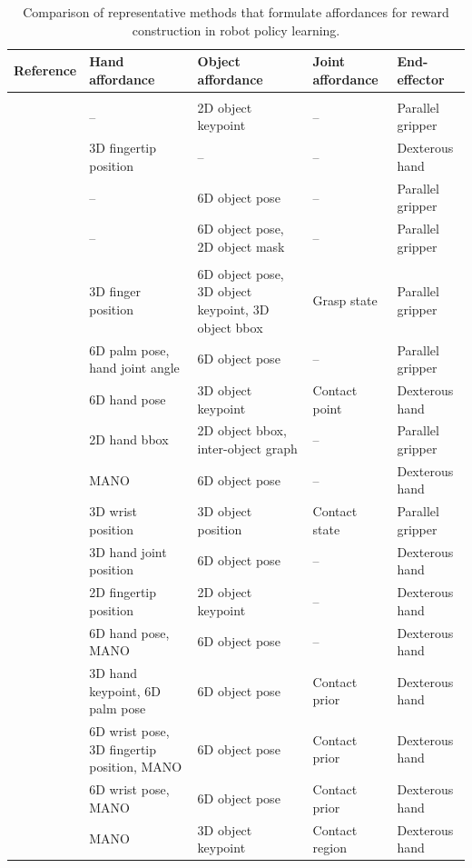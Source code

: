 \documentclass[Afour,sageh,times]{sagej}
\begin{document}
\begin{table}[t]
\centering
\scriptsize
\setlength{\tabcolsep}{3.2pt}
\caption{Comparison of representative methods that formulate affordances for reward construction in robot policy learning.}
\label{tab:affordance_reward}
\begin{tabularx}{\linewidth}{p{3.3cm}p{3.3cm}p{5.5cm} X X}
\toprule
Reference & Hand affordance & Object affordance & Joint affordance & End-effector \\
\midrule
\rowcolor{gray!15}
\multicolumn{5}{l}{\textit{Single-modality reward construction}} \\
\cite{das2021model} & -- & 2D object keypoint & -- & Parallel gripper \\
\cite{singh2025deep} & 3D fingertip position & -- & -- & Dexterous hand \\
\cite{dan2025x} & -- & 6D object pose & -- & Parallel gripper \\
\cite{ye2025video2policy} & -- & 6D object pose, 2D object mask & -- & Parallel gripper \\
\midrule
\rowcolor{gray!15}
\multicolumn{5}{l}{\textit{Multimodal reward construction}} \\
\cite{sieb2020graph} & 3D finger position & 6D object pose, 3D object keypoint, 3D object bbox & Grasp state & Parallel gripper \\
\cite{patel2022learning} & 6D palm pose, hand joint angle & 6D object pose & -- & Parallel gripper \\
\cite{mandikal2022dexvip} & 6D hand pose & 3D object keypoint & Contact point & Dexterous hand \\
\cite{kumar2023graph} & 2D hand bbox & 2D object bbox, inter-object graph & -- & Parallel gripper \\
\cite{lum2025crossing} & MANO & 6D object pose & -- & Dexterous hand \\
\cite{jonnavittula2025view} & 3D wrist position & 3D object position & Contact state & Parallel gripper \\
\cite{chen2025vividex} & 3D hand joint position & 6D object pose & -- & Dexterous hand \\
\cite{guzey2025bridging} & 2D fingertip position & 2D object keypoint & -- & Dexterous hand \\
\cite{zhao2025dexh2r} & 6D hand pose, MANO & 6D object pose & -- & Dexterous hand \\
\cite{yuan2025hermes} & 3D hand keypoint, 6D palm pose & 6D object pose & Contact prior & Dexterous hand \\
\cite{hsieh2025dexman} & 6D wrist pose, 3D fingertip position, MANO & 6D object pose & Contact prior & Dexterous hand \\
\cite{li2025maniptrans} & 6D wrist pose, MANO & 6D object pose & Contact prior & Dexterous hand \\
\cite{zhao2025towards} & MANO & 3D object keypoint &  Contact region & Dexterous hand \\
\bottomrule
\end{tabularx}
\end{table}
\end{document}
